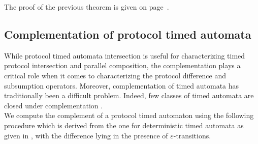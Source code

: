 The proof of the previous theorem is given on page~\pageref{proof:closure-intersection}.


\subsection{Complementation of protocol timed automata}


While protocol timed automata intersection is useful for characterizing timed protocol intersection and parallel composition, the complementation plays a critical role when it comes to characterizing the protocol difference and subsumption operators. Moreover, complementation of timed automata has traditionally been a difficult problem. Indeed, few classes of timed automata are closed under complementation \cite{RAPM04}.\\

We compute the complement of a protocol timed automaton using the following procedure which is derived from the one for deterministic timed automata as given in \cite{RADLD94}, with the difference lying in the presence of $\varepsilon$-transitions.

